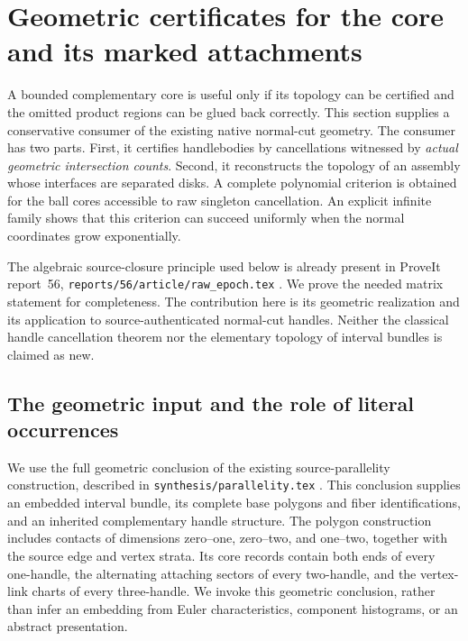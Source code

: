 \section{Geometric certificates for the core and its marked attachments}
\label{geo:section}

A bounded complementary core is useful only if its topology can be
certified and the omitted product regions can be glued back correctly.
This section supplies a conservative consumer of the existing native
normal-cut geometry.  The consumer has two parts.  First, it certifies
handlebodies by cancellations witnessed by \emph{actual geometric
intersection counts}.  Second, it reconstructs the topology of an assembly
whose interfaces are separated disks.  A complete polynomial criterion is
obtained for the ball cores accessible to raw singleton cancellation.
An explicit infinite family shows that this criterion can succeed uniformly
when the normal coordinates grow exponentially.

The algebraic source-closure principle used below is already present in
ProveIt report~56, \texttt{reports/56/article/raw\_epoch.tex}
\cite{ProveIt2026}.  We prove the needed matrix statement for completeness.
The contribution here is its geometric realization and its application to
source-authenticated normal-cut handles.  Neither the classical handle
cancellation theorem nor the elementary topology of interval bundles is
claimed as new.

\subsection{The geometric input and the role of literal occurrences}
\label{geo:input}

We use the full geometric conclusion of the existing source-parallelity
construction, described in \texttt{synthesis/parallelity.tex}
\cite{ProveIt2026}.  This conclusion supplies an embedded interval bundle,
its complete base polygons and fiber identifications, and an inherited
complementary handle structure.  The polygon construction includes contacts
of dimensions zero--one, zero--two, and one--two, together with the source
edge and vertex strata.  Its core records contain both ends of every
one-handle, the alternating attaching sectors of every two-handle, and the
vertex-link charts of every three-handle.  We invoke this geometric
conclusion, rather than infer an embedding from Euler characteristics,
component histograms, or an abstract presentation.

